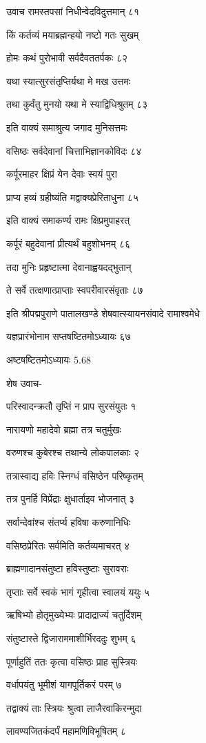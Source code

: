उवाच रामस्तपसां निधीन्वेदविदुत्तमान् ८१

किं कर्तव्यं मयाब्रह्मन्हयो नष्टो गतः सुखम्

होमः कथं पुरोभावी सर्वदैवततर्पकः ८२

यथा स्यात्सुरसंतृप्तिर्यथा मे मख उत्तमः

तथा कुर्वंतु मुनयो यथा मे स्याद्विधिश्रुतम् ८३

इति वाक्यं समाश्रुत्य जगाद मुनिसत्तमः

वसिष्ठः सर्वदेवानां चित्ताभिज्ञानकोविदः ८४

कर्पूरमाहर क्षिप्रं येन देवाः स्वयं पुरा

प्राप्य हव्यं ग्रहीष्यंति मद्वाक्यप्रेरिताधुना ८५

इति वाक्यं समाकर्ण्य रामः क्षिप्रमुपाहरत्

कर्पूरं बहुदेवानां प्रीत्यर्थं बहुशोभनम् ८६

तदा मुनिः प्रहृष्टात्मा देवानाह्वयदद्भुतान्

ते सर्वे तत्क्षणात्प्राप्ताः स्वपरीवारसंवृताः ८७

इति श्रीपद्मपुराणे पातालखण्डे शेषवात्स्यायनसंवादे रामाश्वमेधे

यज्ञप्रारंभोनाम सप्तषष्टितमोऽध्यायः ६७

अष्टषष्टितमोऽध्यायः 5.68

शेष उवाच-

परिस्वादन्क्रतौ तृप्तिं न प्राप सुरसंयुतः १

नारायणो महादेवो ब्रह्मा तत्र चतुर्मुखः

वरुणश्च कुबेरश्च तथान्ये लोकपालकाः २

तत्रास्वाद्य हविः स्निग्धं वसिष्ठेन परिष्कृतम्

तत्र पुनर्हि विप्रेंद्राः क्षुधार्ताइव भोजनात् ३

सर्वान्देवांश्च संतर्प्य हविषा करुणानिधिः

वसिष्ठप्रेरितः सर्वमिति कर्तव्यमाचरत् ४

ब्राह्मणादानसंतुष्टा हविस्तुष्टाः सुरावराः

तृप्ताः सर्वे स्वकं भागं गृहीत्वा स्वालयं ययुः ५

ऋषिभ्यो होतृमुख्येभ्यः प्रादाद्राज्यं चतुर्दिशम्

संतुष्टास्ते द्विजाराममाशीर्भिरददुः शुभम् ६

पूर्णाहुतिं ततः कृत्वा वसिष्ठः प्राह सुस्त्रियः

वर्धापयंतु भूमीशं यागपूर्तिकरं परम् ७

तद्वाक्यं ताः स्त्रियः श्रुत्वा लाजैरवाकिरन्मुदा

लावण्यजितकंदर्पं महामणिविभूषितम् ८

